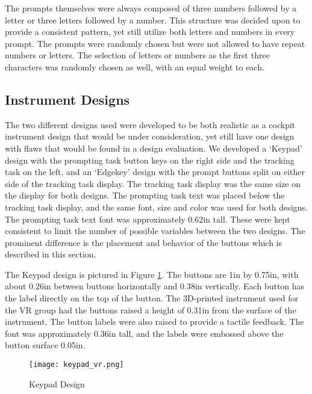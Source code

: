 The prompts themselves were always composed of three numbers followed by a letter or three letters followed by a number.
This structure was decided upon to provide a consistent pattern, yet still utilize both letters and numbers in every prompt.
The prompts were randomly chosen but were not allowed to have repeat numbers or letters. %
The selection of letters or numbers as the first three characters was randomly chosen as well, with an equal weight to each.

\subsection{Instrument Designs}

The two different designs used were developed to be both realistic as a cockpit instrument design that would be under consideration, yet still have one design with flaws that would be found in a design evaluation.
We developed a `Keypad' design with the prompting task button keys on the right side and the tracking task on the left, and an `Edgekey' design with the prompt buttons split on either side of the tracking task display.
The tracking task display was the same size on the display for both designs.
The prompting task text was placed below the tracking task display, and the same font, size and color was used for both designs.
The prompting task text font was approximately 0.62in tall.
These were kept consistent to limit the number of possible variables between the two designs.
The prominent difference is the placement and behavior of the buttons which is described in this section.

The Keypad design is pictured in Figure \ref{fig:de_keypad_design}.
The buttons are 1in by 0.75in, with about 0.26in between buttons horizontally and 0.38in vertically.
Each button has the label directly on the top of the button.
The 3D-printed instrument used for the VR group had the buttons raised a height of 0.31in from the surface of the instrument.
The button labels were also raised to provide a tactile feedback.
The font was approximately 0.36in tall, and the labels were embossed above the button surface 0.05in.

\begin{figure}
    \centering
    \texttt{[image: keypad\_vr.png]}
    \caption{Keypad Design}
    \label{fig:de_keypad_design}
\end{figure}

